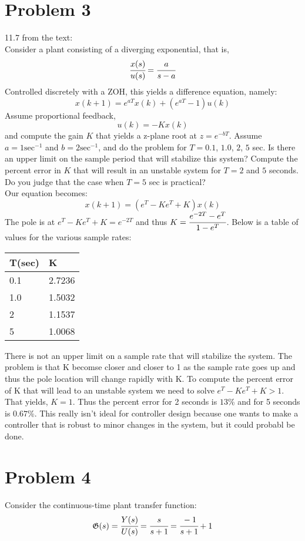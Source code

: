 \documentclass{article}
\begin{document}
\section*{Problem 3}
11.7 from the text:\\
Consider a plant consisting of a diverging exponential, that is,
\[\cfrac{x(s)}{u(s)}=\cfrac{a}{s-a}\]
Controlled discretely with a ZOH, this yields a difference equation, namely:
\[x(k+1)=e^{aT}x(k)+(e^{aT}-1)u(k)\]
Assume proportional feedback,
\[u(k)=-Kx(k)\]
and compute the gain $K$ that yields a z-plane root at $z=e^{-bT}$. Assume $a=1\text{sec}^{-1}$ and $b=2\text{sec}^{-1}$, and do the problem for $T=0.1$, $1.0$, $2$, $5$ sec. Is there an upper limit on the sample period that will stabilize this system? Compute the percent error in $K$ that will result in an unstable system for $T=2$ and $5$ seconds. Do you judge that the case when $T=5$ sec is practical?\\
Our equation becomes:
\[x(k+1)=(e^T-Ke^T+K)x(k)\]
The pole is at $e^T-Ke^T+K=e^{-2T}$ and thus $K=\cfrac{e^{-2T}-e^T}{1-e^T}$. Below is a table of values for the various sample rates:
\begin{table}[H]
    \centering
    \begin{tabular}{|l|l|}
        \hline
        T(sec) & K\\\hline
        0.1 &2.7236 \\\hline
        1.0 &1.5032 \\\hline
        2 &1.1537 \\\hline
        5 &1.0068 \\\hline
    \end{tabular}
\end{table}
There is not an upper limit on a sample rate that will stabilize the system. The problem is that K becomse closer and closer to 1 as the sample rate goes up and thus the pole location will change rapidly with K. To compute the percent error of K that will lead to an unstable system we need to solve $e^T-Ke^T+K>1$. That yields, $K=1$. Thus the percent error for 2 seconds is $13$\% and for 5 seconds is $0.67$\%. This really isn't ideal for controller design because one wants to make a
controller that is robust to minor changes in the system, but it could probabl be done.

\section*{Problem 4}
Consider the continuous-time plant transfer function:
\[\mathfrak{G}(s)=\cfrac{Y(s)}{U(s)}=\cfrac{s}{s+1}=\cfrac{-1}{s+1}+1\]
\end{document}
